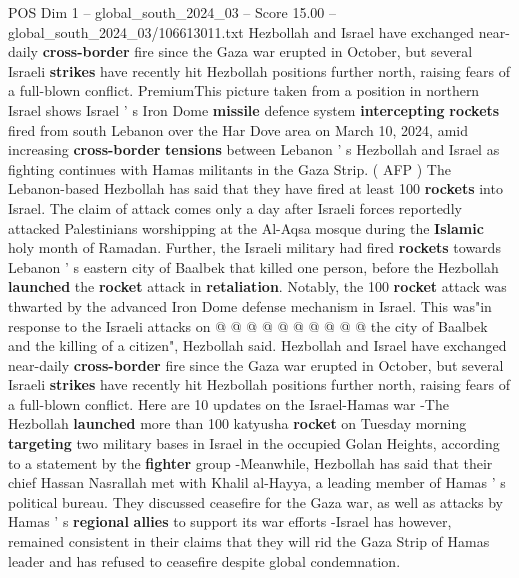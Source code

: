 \begin{textsample}{POS Dim 1 – global\_south\_2024\_03 – Score 15.00 – global\_south\_2024\_03/106613011.txt}  \label{ex:f1_pos_342}
Hezbollah and Israel have exchanged near-daily \textbf{cross-border} fire since the Gaza war erupted in October, but several Israeli \textbf{strikes} have recently hit Hezbollah positions further north, raising fears of a full-blown conflict.
PremiumThis picture taken from a position in northern Israel shows Israel ' s Iron Dome \textbf{missile} defence system \textbf{intercepting} \textbf{rockets} fired from south Lebanon over the Har Dove area on March 10, 2024, amid increasing \textbf{cross-border} \textbf{tensions} between Lebanon ' s Hezbollah and Israel as fighting continues with Hamas militants in the Gaza Strip. ( AFP ) The Lebanon-based Hezbollah has said that they have fired at least 100 \textbf{rockets} into Israel.
The claim of attack comes only a day after Israeli forces reportedly attacked Palestinians worshipping at the Al-Aqsa mosque during the \textbf{Islamic} holy month of Ramadan.
Further, the Israeli military had fired \textbf{rockets} towards Lebanon ' s eastern city of Baalbek that killed one person, before the Hezbollah \textbf{launched} the \textbf{rocket} attack in \textbf{retaliation}.
Notably, the 100 \textbf{rocket} attack was thwarted by the advanced Iron Dome defense mechanism in Israel.
This was"in response to the Israeli attacks on @ @ @ @ @ @ @ @ @ @ the city of Baalbek and the killing of a citizen", Hezbollah said.
Hezbollah and Israel have exchanged near-daily \textbf{cross-border} fire since the Gaza war erupted in October, but several Israeli \textbf{strikes} have recently hit Hezbollah positions further north, raising fears of a full-blown conflict.
Here are 10 updates on the Israel-Hamas war -The Hezbollah \textbf{launched} more than 100 katyusha \textbf{rocket} on Tuesday morning \textbf{targeting} two military bases in Israel in the occupied Golan Heights, according to a statement by the \textbf{fighter} group -Meanwhile, Hezbollah has said that their chief Hassan Nasrallah met with Khalil al-Hayya, a leading member of Hamas ' s political bureau.
They discussed ceasefire for the Gaza war, as well as attacks by Hamas ' s \textbf{regional} \textbf{allies} to support its war efforts -Israel has however, remained consistent in their claims that they will rid the Gaza Strip of Hamas leader and has refused to ceasefire despite global condemnation.

\end{textsample}
